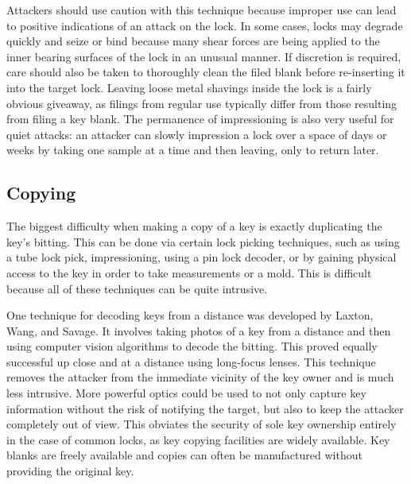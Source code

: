 \documentclass{acm_proc_article-sp}
\begin{document}
Attackers should use caution with this technique because improper use can lead to positive indications of an attack on the lock. In some cases, locks may degrade quickly and seize or bind because many shear forces are being applied to the inner bearing surfaces of the lock in an unusual manner. If discretion is required, care should also be taken to thoroughly clean the filed blank before re-inserting it into the target lock. Leaving loose metal shavings inside the lock is a fairly obvious giveaway, as filings from regular use typically differ from those resulting from filing a key blank. The permanence of impressioning is also very useful for quiet attacks: an attacker can slowly impression a lock over a space of days or weeks by taking one sample at a time and then leaving, only to return later.

\subsection{Copying}
The biggest difficulty when making a copy of a key is exactly duplicating the key's bitting. This can be done via certain lock picking techniques, such as using a tube lock pick, impressioning, using a pin lock decoder, or by gaining physical access to the key in order to take measurements or a mold. This is difficult because all of these techniques can be quite intrusive.

One technique for decoding keys from a distance was developed by Laxton, Wang, and Savage. It involves taking photos of a key from a distance and then using computer vision algorithms to decode the bitting. This proved equally successful up close and at a distance using long-focus lenses. This technique removes the attacker from the immediate vicinity of the key owner and is much less intrusive. More powerful optics could be used to not only capture key information without the risk of notifying the target, but also to keep the attacker completely out of view. This obviates the security of sole key ownership entirely in the case of common locks, as key copying facilities are widely available. Key blanks are freely available and copies can often be manufactured without providing the original key.
\end{document}
